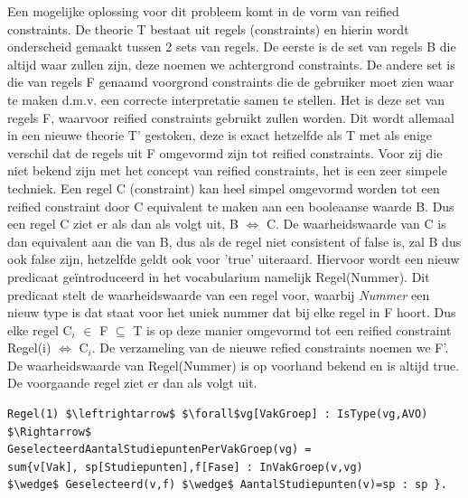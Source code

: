 Een mogelijke oplossing voor dit probleem komt in de vorm van reified constraints. De theorie T bestaat uit regels (constraints) en hierin wordt onderscheid gemaakt tussen 2 sets van regels. De eerste is de set van regels B die altijd waar zullen zijn, deze noemen we achtergrond constraints. De andere set is die van regels F genaamd voorgrond constraints die de gebruiker moet zien waar te maken d.m.v. een correcte interpretatie samen te stellen. Het is deze set van regels F, waarvoor reified constraints gebruikt zullen worden. Dit wordt allemaal in een nieuwe theorie T' gestoken, deze is exact hetzelfde als T met als enige verschil dat de regels uit F omgevormd zijn tot reified constraints. Voor zij die niet bekend zijn met het concept van reified constraints, het is een zeer simpele techniek. Een regel C (constraint) kan heel simpel omgevormd worden tot een reified constraint door C equivalent te maken aan een booleaanse waarde B. Dus een regel C ziet er als dan als volgt uit, B $\Leftrightarrow$ C. De waarheidswaarde van C is dan equivalent aan die van B, dus als de regel niet consistent of false is, zal B dus ook false zijn, hetzelfde geldt ook voor 'true' uiteraard. Hiervoor wordt een nieuw predicaat ge\"{i}ntroduceerd in het vocabularium namelijk Regel(Nummer). Dit predicaat stelt de waarheidswaarde van een regel voor, waarbij \textit{Nummer} een nieuw type is dat staat voor het uniek nummer dat bij elke regel in F hoort. Dus elke regel  C$_{i}$ $\in$ F $\subseteq$ T is op deze manier omgevormd tot een reified constraint Regel(i) $\Leftrightarrow$ C$_{i}$. De verzameling van de nieuwe refied constraints noemen we F'. De waarheidswaarde van Regel(Nummer) is op voorhand bekend en is altijd true. De voorgaande regel ziet er dan als volgt uit. 
\lstset{basicstyle=\scriptsize}
\begin{lstlisting}[mathescape, caption=IDP Reified Constraint Example, frame=single]
Regel(1) $\leftrightarrow$ $\forall$vg[VakGroep] : IsType(vg,AVO) $\Rightarrow$ 
GeselecteerdAantalStudiepuntenPerVakGroep(vg) = 
sum{v[Vak], sp[Studiepunten],f[Fase] : InVakGroep(v,vg) 
$\wedge$ Geselecteerd(v,f) $\wedge$ AantalStudiepunten(v)=sp : sp }.
\end{lstlisting}
